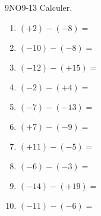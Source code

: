 \documentclass[a4paper,12pt]{report}
\begin{document}
\begin{EXO}{}{9NO9-13}
Calculer.
\begin{multicols}{3}
\begin{enumerate}[]
	\item \begin{minipage}[t]{\linewidth} $ (+2) - (-8) =$ \end{minipage}
	\item \begin{minipage}[t]{\linewidth} $ (-10) - (-8) =$ \end{minipage}
	\item \begin{minipage}[t]{\linewidth} $ (-12) - (+15) =$ \end{minipage}
	\item \begin{minipage}[t]{\linewidth} $ (-2) - (+4) =$ \end{minipage}
	\item \begin{minipage}[t]{\linewidth} $ (-7) - (-13) =$ \end{minipage}
	\item \begin{minipage}[t]{\linewidth} $ (+7) - (-9) =$ \end{minipage}
	\item \begin{minipage}[t]{\linewidth} $ (+11) - (-5) =$ \end{minipage}
	\item \begin{minipage}[t]{\linewidth} $ (-6) - (-3) =$ \end{minipage}
	\item \begin{minipage}[t]{\linewidth} $ (-14) - (+19) =$ \end{minipage}
	\item \begin{minipage}[t]{\linewidth} $ (-11) - (-6) =$ \end{minipage}
\end{enumerate}
\end{multicols}
\end{EXO}
\end{document}
